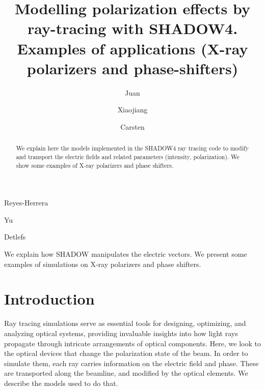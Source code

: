 \documentclass{iucr}
\begin{document}

\title{Modelling polarization effects by ray-tracing with SHADOW4. Examples of applications (X-ray polarizers and phase-shifters)}

\author[1]{{Juan}}{{Reyes-Herrera}}
\author[2]{{Xiaojiang}}{{Yu}}
\author[1]{{Carsten}}{{Detlefs}}


\maketitle   %


\begin{synopsis}
We explain how SHADOW manipulates the electric vectors. We present some examples of simulations on X-ray polarizers and phase shifters. 
\end{synopsis}


\begin{abstract}
We explain here the models implemented in the SHADOW4 ray tracing code to modify and transport the electric fields and related parameters (intensity, polarization). We show some examples of X-ray polarizers and phase shifters.
\end{abstract}

\section{Introduction}\label{sec:introduction}

Ray tracing simulations serve as essential tools for designing, optimizing, and analyzing optical systems, providing invaluable insights into how light rays propagate through intricate arrangements of optical components. Here, we look to the optical devices that change the polarization state of the beam. In order to simulate them, each ray carries information on the electric field and phase. These are transported along the beamline, and modified by the optical elements. We describe the models used to do that. 
\end{document}
